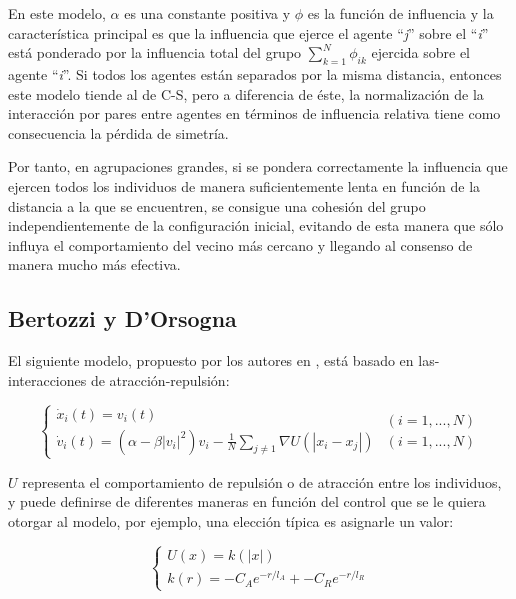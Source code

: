 En este modelo, $\alpha$ es una constante positiva y $\phi$ es la función de influencia y la característica principal es que la influencia que ejerce el agente ``\textit{j}'' sobre el ``\textit{i}'' está ponderado por la influencia total del grupo $\sum_{k=1}^{N}\phi_{ik}$ ejercida sobre el agente ``\textit{i}''. Si todos los agentes están separados por la misma distancia, entonces este modelo tiende al de C-S, pero a diferencia de éste, la normalización de la interacción por pares entre agentes en términos de influencia relativa tiene como consecuencia la pérdida de simetría.

Por tanto, en agrupaciones grandes, si se pondera correctamente la influencia que ejercen todos los individuos de manera suficientemente lenta en función de la distancia a la que se encuentren, se consigue una cohesión del grupo independientemente de la configuración inicial, evitando de esta manera que sólo influya el comportamiento del vecino más cercano y llegando al consenso de manera mucho más efectiva.

 \subsection{Bertozzi y D'Orsogna}
 El siguiente modelo, propuesto por los autores \citeauthor{d2006self} en \cite{d2006self}, está basado en las- interacciones de atracción-repulsión:

\begin{equation}\label{eq:attractionRepulsion} 
    \left\lbrace
    \begin{array}{ll}
        \dot{x}_{i}(t)=v_{i}(t) \\
        \dot{v}_{i}(t)=\displaystyle{(\alpha - \beta |v_{i}|^{2})v_{i} -\frac{1}{N}\sum_{j\neq 1}\nabla U(|x_{i}-x_{j}|)}
    \end{array}
    \begin{array}{rr}
        (i = 1, ..., N) \\
        (i = 1, ..., N)
    \end{array}
    \right.
\end{equation}

$U$ representa el comportamiento de repulsión o de atracción entre los individuos, y puede definirse de diferentes maneras en función del control que se le quiera otorgar al modelo, por ejemplo, una elección típica es asignarle un valor: 

\begin{equation}\label{eq:potencialU}
    \left\lbrace
    \begin{array}{l}
        U(x) = k(|x|) \\
        k(r) = -C_{A}e^{-r/l_{A}}+-C_{R}e^{-r/l_{R}}
    \end{array}
    \right.
\end{equation}

